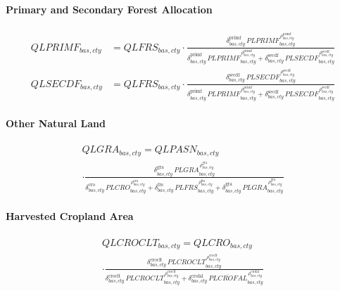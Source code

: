 \paragraph{Primary and Secondary Forest Allocation}
\begin{align}
  QLPRIMF_{bas,cty}
  &= QLFRS_{bas,cty}
     \cdot
     \frac{
       \delta^{\text{primf}}_{bas,cty}\, PLPRIMF_{bas,cty}^{\,\rho^{\text{primf}}_{bas,cty}}
     }{
       \delta^{\text{primf}}_{bas,cty}\, PLPRIMF_{bas,cty}^{\,\rho^{\text{primf}}_{bas,cty}}
       +
       \delta^{\text{secdf}}_{bas,cty}\, PLSECDF_{bas,cty}^{\,\rho^{\text{secdf}}_{bas,cty}}
     }
  \tag{QLPRIMFEQ}\label{eq:QLPRIMFEQ}\\[0.4em]
  QLSECDF_{bas,cty}
  &= QLFRS_{bas,cty}
     \cdot
     \frac{
       \delta^{\text{secdf}}_{bas,cty}\, PLSECDF_{bas,cty}^{\,\rho^{\text{secdf}}_{bas,cty}}
     }{
       \delta^{\text{primf}}_{bas,cty}\, PLPRIMF_{bas,cty}^{\,\rho^{\text{primf}}_{bas,cty}}
       +
       \delta^{\text{secdf}}_{bas,cty}\, PLSECDF_{bas,cty}^{\,\rho^{\text{secdf}}_{bas,cty}}
     }
  \tag{QLSECDFEQ}\label{eq:QLSECDFEQ}
\end{align}

\paragraph{Other Natural Land}
\begin{multline}
  QLGRA_{bas,cty} = QLPASN_{bas,cty}\\
  \cdot
  \frac{
    \delta^{\text{gra}}_{bas,cty}\, PLGRA_{bas,cty}^{\,\rho^{\text{gra}}_{bas,cty}}
  }{
    \delta^{\text{cro}}_{bas,cty}\, PLCRO_{bas,cty}^{\,\rho^{\text{cro}}_{bas,cty}}
    + \delta^{\text{frs}}_{bas,cty}\, PLFRS_{bas,cty}^{\,\rho^{\text{frs}}_{bas,cty}}
    + \delta^{\text{gra}}_{bas,cty}\, PLGRA_{bas,cty}^{\,\rho^{\text{gra}}_{bas,cty}}
  }
  \tag{QLGRAEQ}\label{eq:QLGRAEQ}
\end{multline}

\paragraph{Harvested Cropland Area}
\begin{multline}
  QLCROCLT_{bas,cty} = QLCRO_{bas,cty}\\
  \cdot
  \frac{
    \delta^{\text{croclt}}_{bas,cty}\, PLCROCLT_{bas,cty}^{\,\rho^{\text{croclt}}_{bas,cty}}
  }{
    \delta^{\text{croclt}}_{bas,cty}\, PLCROCLT_{bas,cty}^{\,\rho^{\text{croclt}}_{bas,cty}}
    + \delta^{\text{crofal}}_{bas,cty}\, \overline{PLCROFAL}_{bas,cty}^{\,\rho^{\text{crofal}}_{bas,cty}}
  }
  \tag{QLCROCLTEQ}\label{eq:QLCROCLTEQ}
\end{multline}

